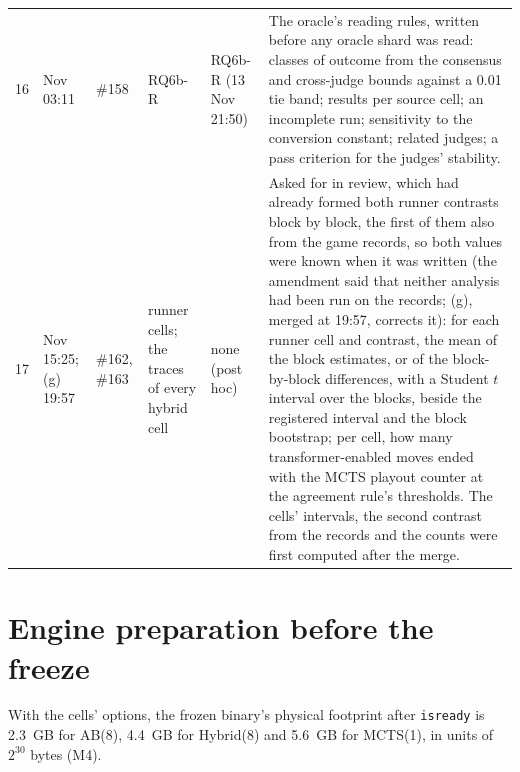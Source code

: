 \documentclass{article}
\begin{document}
\begin{table}[ht]
\begin{tabular}{r>{\raggedright\arraybackslash}p{1.95cm}>{\raggedright\arraybackslash}p{1.1cm}>{\raggedright\arraybackslash}p{2.0cm}>{\raggedright\arraybackslash}p{2.1cm}>{\raggedright\arraybackslash}p{6.85cm}}
16 & 9 Nov 03:11 & \#158 & RQ6b-R & RQ6b-R (13 Nov 21:50) & The oracle's reading rules, written before any oracle shard was read: classes of outcome from the consensus and cross-judge bounds against a 0.01 tie band; results per source cell; an incomplete run; sensitivity to the conversion constant; related judges; a pass criterion for the judges' stability. \\
17 & 10 Nov 15:25; (g) 19:57 & \#162, \#163 & runner cells; the traces of every hybrid cell & none (post hoc) & Asked for in review, which had already formed both runner contrasts block by block, the first of them also from the game records, so both values were known when it was written (the amendment said that neither analysis had been run on the records; (g), merged at 19:57, corrects it): for each runner cell and contrast, the mean of the block estimates, or of the block-by-block differences, with a Student $t$ interval over the blocks, beside the registered interval and the block bootstrap; per cell, how many transformer-enabled moves ended with the MCTS playout counter at the agreement rule's thresholds. The cells' intervals, the second contrast from the records and the counts were first computed after the merge. \\
\bottomrule
\end{tabular}
\end{table}

\section{Engine preparation before the freeze}
\label{app:prep}
With the cells' options, the frozen binary's physical footprint after \texttt{isready} is 2.3~GB for AB(8), 4.4~GB for Hybrid(8) and 5.6~GB for MCTS(1), in units of $2^{30}$ bytes (M4). %
\end{document}
